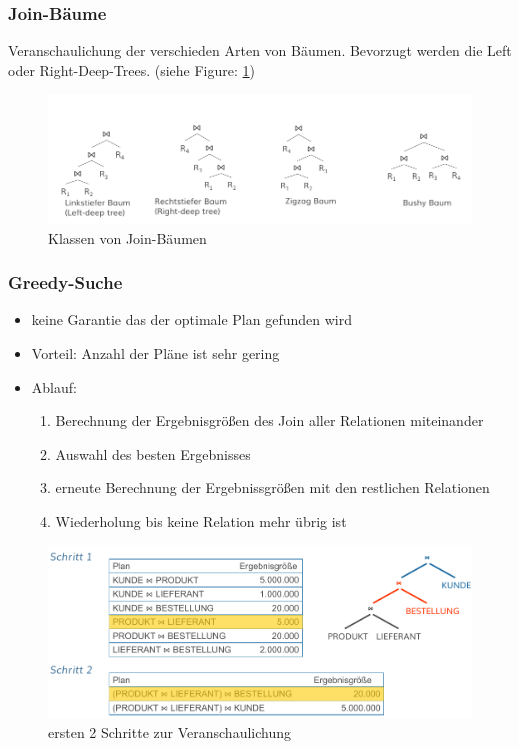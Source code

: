 \documentclass[a4paper]{article}
\begin{document}
    \subsubsection{Join-Bäume}
    Veranschaulichung der verschieden Arten von Bäumen. Bevorzugt werden die Left oder Right-Deep-Trees. (siehe Figure: \ref{fig:joinBaeume})
    \begin{figure}[!htp]
        \centering
        \includegraphics[width=15cm]{images/joinBaeume.png}
        \caption{Klassen von Join-Bäumen}
        \label{fig:joinBaeume}
    \end{figure}
    
    \subsubsection{Greedy-Suche}
    \begin{itemize}
        \item keine Garantie das der optimale Plan gefunden wird
        \item Vorteil: Anzahl der Pläne ist sehr gering
        \item Ablauf:
        \begin{enumerate}
            \item Berechnung der Ergebnisgrößen des Join aller Relationen miteinander
            \item Auswahl des besten Ergebnisses
            \item erneute Berechnung der Ergebnissgrößen mit den restlichen Relationen
            \item Wiederholung bis keine Relation mehr übrig ist
        \end{enumerate}
    \end{itemize}
    
    \begin{figure}[htp]
        \centering
        \includegraphics[width=15cm]{images/greedySearch.png}
        \caption{ersten 2 Schritte zur Veranschaulichung}
        \label{fig:greedySearch}
    \end{figure}
    
\end{document}
